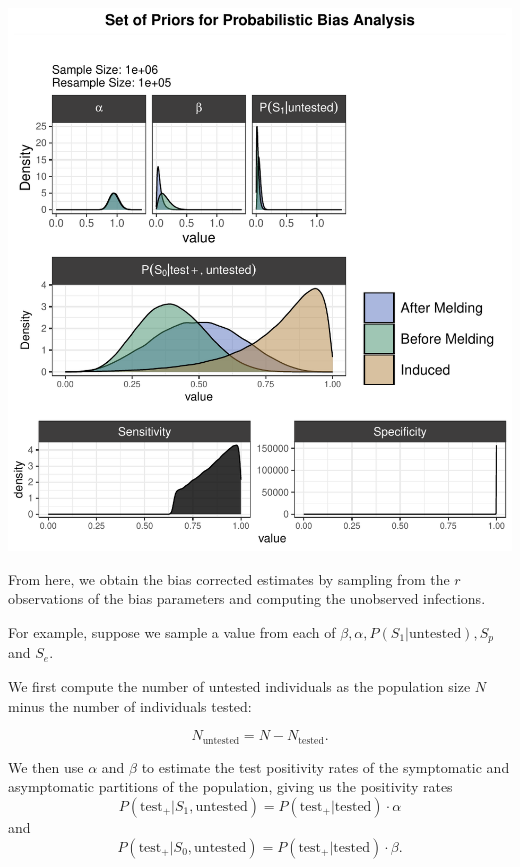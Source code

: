 \documentclass[12pt,twoside]{smiththesis}
\begin{document}
\includegraphics[width=1\linewidth]{thesis_files/figure-latex/unnamed-chunk-69-1}

From here, we obtain the bias corrected estimates by sampling from the \(r\) observations of the bias parameters and computing the unobserved infections.

For example, suppose we sample a value from each of \(\beta,\alpha,P(S_1|\text{untested}), S_p\) and \(S_e\).

We first compute the number of untested individuals as the population size \(N\) minus the number of individuals tested:

\[ N_{\text{untested}} =  N - N_{\text{tested}} .\]

We then use \(\alpha\) and \(\beta\) to estimate the test positivity rates of the symptomatic and asymptomatic partitions of the population, giving us the positivity rates
\[ P( \text{test}_+ | S_1, \text{untested})  = P( \text{test}_+ | \text{tested}) \cdot  \alpha  \]
and
\[ P( \text{test}_+ | S_0, \text{untested})  = P( \text{test}_+ | \text{tested}) \cdot  \beta. \]
\end{document}
